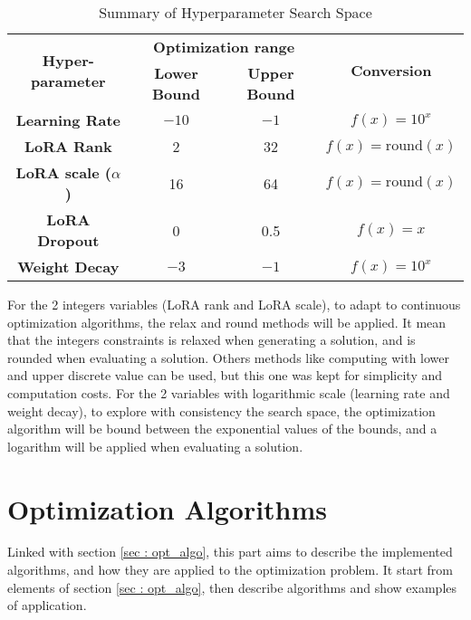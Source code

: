 \begin{table}[h!]
    \centering
    \begin{tabular}{|c|c|c|c|}
        \hline
        \multirow{2}{*}{\textbf{Hyper-parameter}} & \multicolumn{2}{|c|}{\textbf{Optimization range}} & \multirow{2}{*}{\textbf{Conversion}} \\
        \cline{2-3}
         & \textbf{Lower Bound} & \textbf{Upper Bound} &  \\
        \hline
        \textbf{Learning Rate} & $-10$ & $-1$ & $f(x) = 10^{x}$ \\
        \hline
        \textbf{LoRA Rank} & 2 & 32 & $f(x) = \text{round}(x)$ \\
        \hline
        \textbf{LoRA scale ($\alpha$)} & 16 & 64 & $f(x) = \text{round}(x)$ \\
        \hline
        \textbf{LoRA Dropout} & 0 & 0.5 & $f(x) = x$ \\
        \hline
        \textbf{Weight Decay} & $-3$ & $-1$ & $f(x) = 10^{x}$  \\
        \hline
    \end{tabular}
    \caption{Summary of Hyperparameter Search Space}
    \label{tab:hyperparam_table}
\end{table}

For the 2 integers variables (LoRA rank and LoRA scale), to adapt to continuous optimization algorithms, the relax and round methods will be applied. It mean that the integers constraints is relaxed when generating a solution, and is rounded when evaluating a solution. Others methods like computing with lower and upper discrete value can be used, but this one was kept for simplicity and computation costs.
For the 2 variables with logarithmic scale (learning rate and weight decay), to explore with consistency the search space, the optimization algorithm will be bound between the exponential values of the bounds, and a logarithm will be applied when evaluating a solution.

\section{Optimization Algorithms}
\label{sec:opt}
Linked with section \ref{sec : opt_algo}, this part aims to describe the implemented algorithms, and how they are applied to the optimization problem. It start from elements of section \ref{sec : opt_algo}, then describe algorithms and show examples of application.

